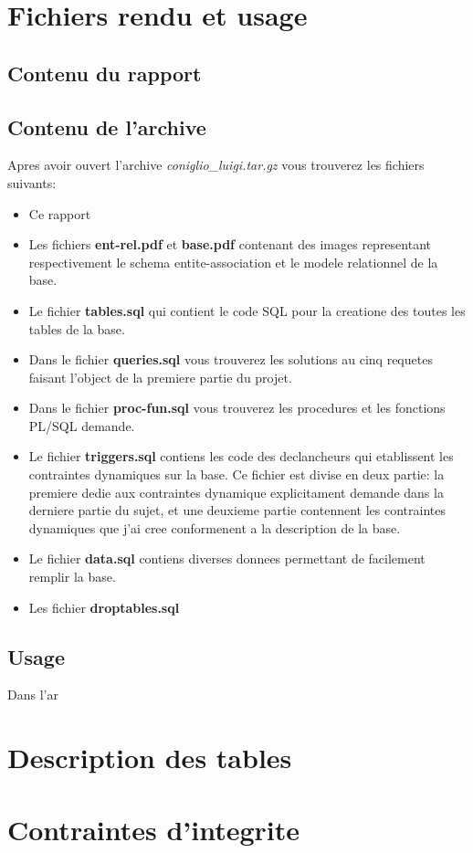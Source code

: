\documentclass[twoside,openright,a4paper,11pt,french]{article}
\begin{document}
\pagestyle{plain}
\setlength{\parindent}{0pt}



\parskip=0pt
\tableofcontents

\newpage


\section{Fichiers rendu et usage}
\subsection{Contenu du rapport}
\subsection{Contenu de l'archive}
Apres avoir ouvert l'archive {\it coniglio\_luigi.tar.gz} vous
trouverez les fichiers suivants:

\begin{itemize}
\item Ce rapport
\item Les fichiers {\bf ent-rel.pdf} et {\bf base.pdf} contenant
      des images representant respectivement le schema entite-association
      et le modele relationnel de la base.
\item Le fichier {\bf tables.sql} qui contient le code SQL pour la
      creatione des toutes les tables de la base.
\item Dans le fichier {\bf queries.sql} vous trouverez les solutions
      au cinq requetes faisant l'object de la premiere partie du projet.
\item Dans le fichier {\bf proc-fun.sql} vous trouverez les procedures
      et les fonctions PL/SQL demande.
\item Le fichier {\bf triggers.sql} contiens les code des declancheurs qui
      etablissent les contraintes dynamiques sur la base.  Ce fichier est divise en
      deux partie: la premiere dedie aux contraintes dynamique explicitament
      demande dans la derniere partie du sujet, et une deuxieme partie contennent les
      contraintes dynamiques que j'ai cree conformenent a la description de la
      base.
\item Le fichier {\bf data.sql} contiens diverses donnees permettant de
      facilement remplir la base.
\item Les fichier {\bf droptables.sql}
\end{itemize}

\subsection{Usage}
Dans l'ar   


\section{Description des tables}

\section{Contraintes d'integrite}


\end{document}
